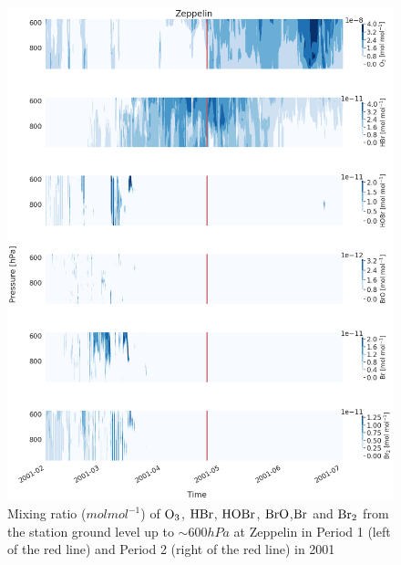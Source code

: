 \begin{figure}[h]
    \centering
    \includegraphics[width=\linewidth]{Chapter6_Results/images/Vert_StationComp_2001/vert_all_species_ZEP.png}
    \caption{Mixing ratio ($mol mol^{-1}$) of $\mathrm{O_3}$, $\mathrm{HBr}$, $\mathrm{HOBr}$, $\mathrm{BrO}$,$\mathrm{Br}$ and $\mathrm{Br_2}$ from the station ground level up to $\sim 600 hPa$ at Zeppelin in Period 1 (left of the red line) and Period 2 (right of the red line) in 2001}
    \label{fig:vert_ZEP}
\end{figure}